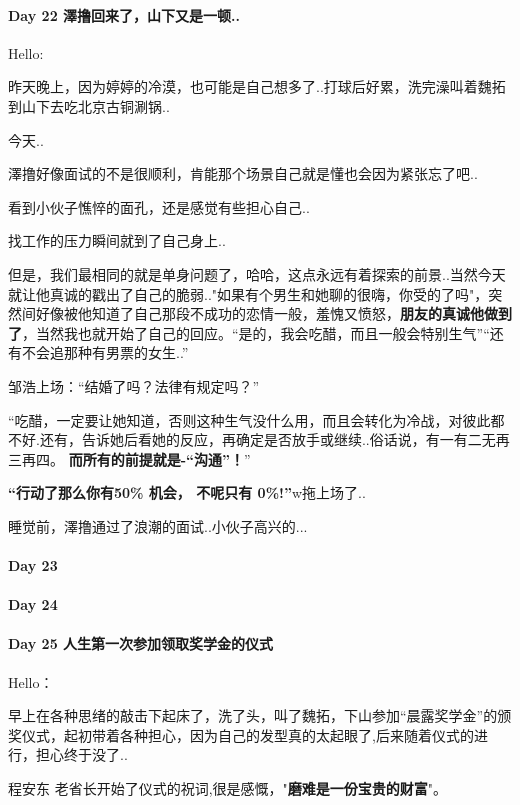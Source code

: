 \documentclass[UTF8,a4paper,8pt]{ctexbook}
\begin{document}
 	 \paragraph{Day 22  澤撸回来了，山下又是一顿..    \quad     }Hello:
 	 
	 	 昨天晚上，因为婷婷的冷漠，也可能是自己想多了..打球后好累，洗完澡叫着魏拓到山下去吃北京古铜涮锅..
	 	 
	 	 今天..
	 	 
	 	 澤撸好像面试的不是很顺利，肯能那个场景自己就是懂也会因为紧张忘了吧..
	 	 
	 	 看到小伙子憔悴的面孔，还是感觉有些担心自己..
	 	 
	 	 找工作的压力瞬间就到了自己身上..
	 	 
	 	 但是，我们最相同的就是单身问题了，哈哈，这点永远有着探索的前景..当然今天就让他真诚的戳出了自己的脆弱.."如果有个男生和她聊的很嗨，你受的了吗"，突然间好像被他知道了自己那段不成功的恋情一般，羞愧又愤怒，\textbf{朋友的真诚他做到了}，当然我也就开始了自己的回应。“是的，我会吃醋，而且一般会特别生气”“还有不会追那种有男票的女生..”
	 	 
	 	 邹浩上场：“结婚了吗？法律有规定吗？”
	 	 
	 	 “吃醋，一定要让她知道，否则这种生气没什么用，而且会转化为冷战，对彼此都不好.还有，告诉她后看她的反应，再确定是否放手或继续..俗话说，有一有二无再三再四。  \textbf{而所有的前提就是-“沟通”！}”
	 	 
	 	 \textbf{“行动了那么你有50\% 机会， 不呢只有 0\%!”}w拖上场了..
	 	 
	 	 
	 	 睡觉前，澤撸通过了浪潮的面试..小伙子高兴的...
 	 \paragraph{Day 23      \quad     }
 	 \paragraph{Day 24      \quad     }
 	 \paragraph{Day 25  人生第一次参加领取奖学金的仪式   \quad     }
	 	 Hello：
	 	 
	 	 早上在各种思绪的敲击下起床了，洗了头，叫了魏拓，下山参加“晨露奖学金”的颁奖仪式，起初带着各种担心，因为自己的发型真的太起眼了,后来随着仪式的进行，担心终于没了..
	 	 
	 	 程安东 老省长开始了仪式的祝词,很是感慨，"\textbf{磨难是一份宝贵的财富}"。
	 	 
\end{document}
